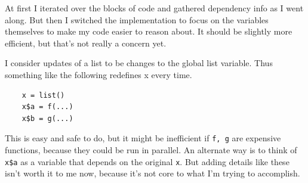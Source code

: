 \documentclass[12pt]{article}
\begin{document}
At first I iterated over the blocks of code and gathered dependency info as
I went along. But then I switched the implementation to focus on the variables
themselves to make my code easier to reason about. It should be slightly
more efficient, but that's not really a concern yet.

I consider updates of a list to be changes to the global list variable.
Thus something like the following redefines x every time. 

\begin{verbatim}
    x = list()
    x$a = f(...)
    x$b = g(...)
\end{verbatim}
 
This is easy and safe to do, but it might be inefficient if \texttt{f, g}
are expensive functions, because they could be run in parallel. An
alternate way is to think of \texttt{x\$a} as a variable that depends on
the original \texttt{x}. But adding details like these isn't worth it to me
now, because it's not core to what I'm trying to accomplish.


\newpage


 
\end{document}
